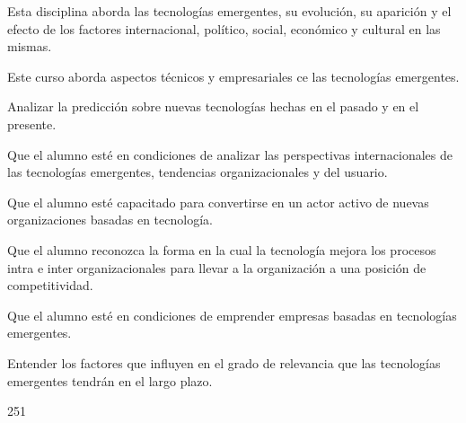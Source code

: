 \begin{syllabus}


\begin{justification}
Esta disciplina aborda las tecnologías emergentes, su evolución, su aparición y el efecto de los factores internacional, político, social, económico y cultural en las mismas.

Este curso aborda aspectos técnicos y empresariales ce las tecnologías emergentes.
\end{justification}

\begin{goals}
\item Analizar la predicción sobre nuevas tecnologías hechas en el pasado y en el presente.
\item Que el alumno esté en condiciones de analizar las perspectivas internacionales de las tecnologías emergentes, tendencias organizacionales y del usuario.
\item Que el alumno esté capacitado para convertirse en un actor activo de nuevas organizaciones basadas en tecnología.
\item Que el alumno reconozca la forma en la cual la tecnología mejora los procesos intra e inter organizacionales para llevar a la organización a una posición de competitividad.
\item Que el alumno esté en condiciones de emprender empresas basadas en tecnologías emergentes.
\item Entender los factores que influyen en el grado de relevancia que las tecnologías emergentes tendrán en el largo plazo.
\end{goals}

\begin{outcomes}
\end{outcomes}

\begin{unit}{\LUTWOOHFIVEDef}{\LUTWOOHFIVEBib}{25}{1}
   \begin{topics}
	\item \TDSONETHREETopicTHREExONETHREExONE
	\begin{subtopics}
		\item \TDSONETHREETopicTHREExONETHREExONExONE
		\item \TDSONETHREETopicTHREExONETHREExONExTWO
		\item \TDSONETHREETopicTHREExONETHREExONExTHREE
		\item \TDSONETHREETopicTHREExONETHREExONExFOUR
		\item \TDSONETHREETopicTHREExONETHREExONExFIVE
	\end{subtopics} 
   \end{topics}
	\LUTWOOHFIVEGoal
\end{unit}


\end{syllabus}
